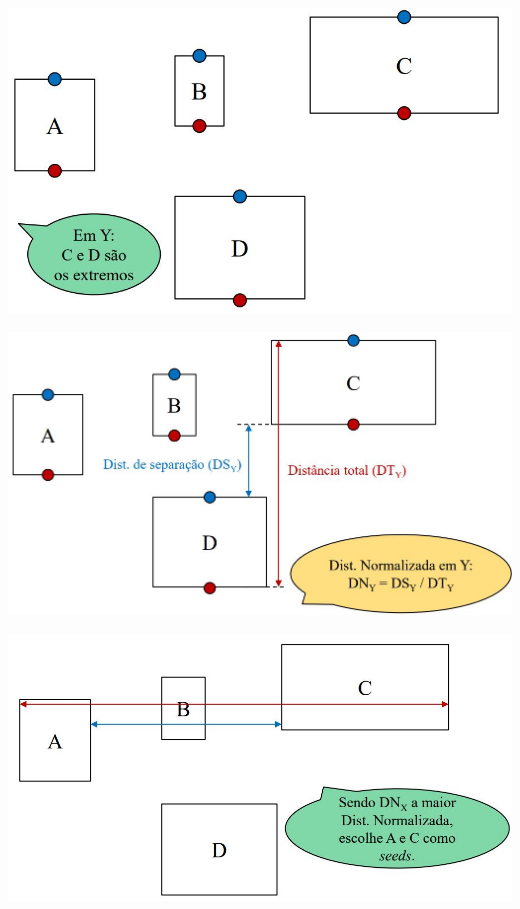 \documentclass[compress,aspectratio=169]{beamer}
\begin{document}
\begin{frame}{}

        \centering
        \includegraphics[width=0.75\linewidth]{split4.JPG}
        \label{fig:enter-label}
        
\end{frame}

\begin{frame}{}

        \centering
        \includegraphics[width=0.75\linewidth]{split5.JPG}
        \label{fig:enter-label}
        
\end{frame}

\begin{frame}{}

        \centering
        \includegraphics[width=0.75\linewidth]{slit2.JPG}
        \label{fig:enter-label}
        
\end{frame}
\end{document}
